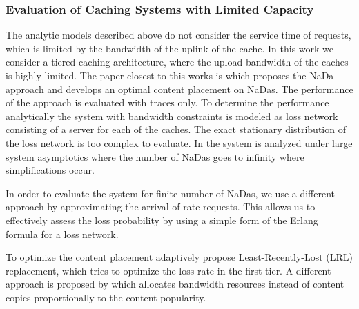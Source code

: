 \subsubsection{Evaluation of Caching Systems with Limited Capacity}

The analytic models described above do not consider the service time of requests, which is limited by the bandwidth of the uplink of the cache.
In this work we consider a tiered caching architecture, where the upload bandwidth of the caches is highly limited.
The paper closest to this works is \cite{valancius2009greening} which proposes the NaDa approach and develops an optimal content placement on NaDas.
The performance of the approach is evaluated with traces only.
To determine the performance analytically the system with bandwidth constraints is modeled as loss network consisting of a server for each of the caches. The exact stationary distribution of the loss network is too complex to evaluate.
In \cite{tan2013optimal} the system is analyzed under large system asymptotics where the number of NaDas goes to infinity where simplifications occur.

In order to evaluate the system for finite number of NaDas, we use a different approach by approximating the arrival of rate requests.
This allows us to effectively assess the loss probability by using a simple form of the Erlang formula for a loss network.

To optimize the content placement adaptively \cite{leconte2014adaptive} propose Least-Recently-Lost (LRL) replacement, which tries to optimize the loss rate in the first tier.
A different approach is proposed by \cite{zhou2015unifying} which allocates bandwidth resources instead of content copies proportionally to the content popularity.
